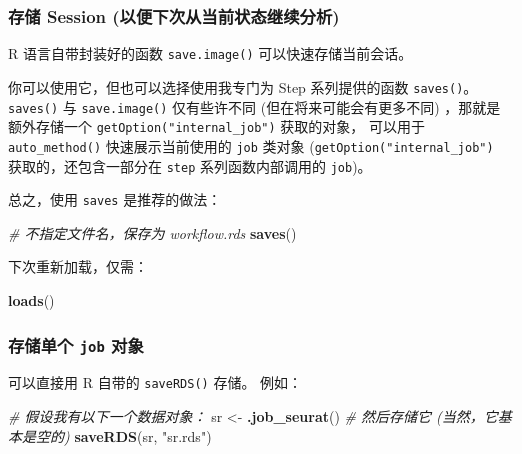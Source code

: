 \documentclass[
]{article}
\newenvironment{Shaded}{\begin{snugshade}}{\end{snugshade}}
\newcommand{\CommentTok}[1]{\textcolor[rgb]{0.56,0.35,0.01}{\textit{#1}}}
\newcommand{\KeywordTok}[1]{\textcolor[rgb]{0.13,0.29,0.53}{\textbf{#1}}}
\newcommand{\NormalTok}[1]{#1}
\newcommand{\StringTok}[1]{\textcolor[rgb]{0.31,0.60,0.02}{#1}}
\begin{document}
\hypertarget{ux5b58ux50a8-session-ux4ee5ux4fbfux4e0bux6b21ux4eceux5f53ux524dux72b6ux6001ux7ee7ux7eedux5206ux6790}{%
\subsubsection{存储 Session (以便下次从当前状态继续分析)}\label{ux5b58ux50a8-session-ux4ee5ux4fbfux4e0bux6b21ux4eceux5f53ux524dux72b6ux6001ux7ee7ux7eedux5206ux6790}}

R 语言自带封装好的函数 \texttt{save.image()} 可以快速存储当前会话。

你可以使用它，但也可以选择使用我专门为 Step 系列提供的函数 \texttt{saves()}。
\texttt{saves()} 与 \texttt{save.image()} 仅有些许不同 (但在将来可能会有更多不同) ，那就是
额外存储一个 \texttt{getOption("internal\_job")} 获取的对象，
可以用于 \texttt{auto\_method()} 快速展示当前使用的 \texttt{job} 类对象
(\texttt{getOption("internal\_job")} 获取的，还包含一部分在 \texttt{step} 系列函数内部调用的 \texttt{job})。

总之，使用 \texttt{saves} 是推荐的做法：

\begin{Shaded}
\begin{Highlighting}[]
\CommentTok{\# 不指定文件名，保存为 \textquotesingle{}workflow.rds\textquotesingle{}}
\KeywordTok{saves}\NormalTok{()}
\end{Highlighting}
\end{Shaded}

下次重新加载，仅需：

\begin{Shaded}
\begin{Highlighting}[]
\KeywordTok{loads}\NormalTok{()}
\end{Highlighting}
\end{Shaded}

\hypertarget{ux5b58ux50a8ux5355ux4e2a-job-ux5bf9ux8c61}{%
\subsubsection{\texorpdfstring{存储单个 \texttt{job} 对象}{存储单个 job 对象}}\label{ux5b58ux50a8ux5355ux4e2a-job-ux5bf9ux8c61}}

可以直接用 R 自带的 \texttt{saveRDS()} 存储。
例如：

\begin{Shaded}
\begin{Highlighting}[]
\CommentTok{\# 假设我有以下一个数据对象：}
\NormalTok{sr \textless{}{-}}\StringTok{ }\KeywordTok{.job\_seurat}\NormalTok{()}
\CommentTok{\# 然后存储它 (当然，它基本是空的) }
\KeywordTok{saveRDS}\NormalTok{(sr, }\StringTok{"sr.rds"}\NormalTok{)}
\end{Highlighting}
\end{Shaded}
\end{document}
